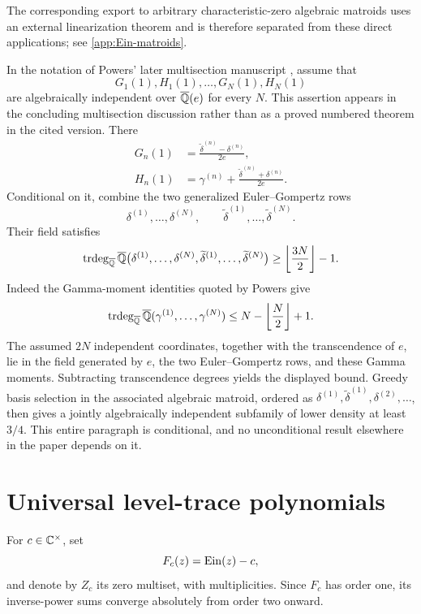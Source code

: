 The corresponding export to arbitrary characteristic-zero algebraic
matroids uses an external linearization theorem and is therefore separated
from these direct applications; see \cref{app:Ein-matroids}.

\begin{remark}
\label{rem:Powers-conditional}
In the notation of Powers' later multisection manuscript
\cite[\S5]{Powers2025}, assume that
\[
 G_1(1),H_1(1),\ldots,G_N(1),H_N(1)
\]
are algebraically independent over \(\overline{\mathbb Q}(e)\) for every \(N\).  This
assertion appears in the concluding multisection discussion rather than as
a proved numbered theorem in the cited version.  There
\begin{align*}
 G_n(1)&=\frac{\widetilde\delta^{(n)}-\delta^{(n)}}{2e},\\
 H_n(1)&=\gamma^{(n)}+
 \frac{\widetilde\delta^{(n)}+\delta^{(n)}}{2e}.
\end{align*}
Conditional on it, combine the two generalized Euler--Gompertz rows
\[
 \delta^{(1)},\ldots,\delta^{(N)},\qquad
 \widetilde\delta^{(1)},\ldots,\widetilde\delta^{(N)}.
\]
Their field satisfies
\[
 \operatorname{trdeg}_{\overline{\mathbb Q}}\overline{\mathbb Q}\bigl(
 \delta^{(1)},\ldots,\delta^{(N)},
 \widetilde\delta^{(1)},\ldots,\widetilde\delta^{(N)}\bigr)
 \ge\left\lfloor\frac{3N}{2}\right\rfloor-1.
\]
Indeed the Gamma-moment identities quoted by Powers give
\[
 \operatorname{trdeg}_{\overline{\mathbb Q}}\overline{\mathbb Q}(\gamma^{(1)},\ldots,\gamma^{(N)})
 \le N-\left\lfloor\frac N2\right\rfloor+1.
\]
The assumed \(2N\) independent coordinates, together with the
transcendence of \(e\), lie in the field generated by \(e\), the two
Euler--Gompertz rows, and these Gamma moments.  Subtracting transcendence
degrees yields the displayed bound.  Greedy basis selection in the
associated algebraic matroid, ordered as
\(\delta^{(1)},\widetilde\delta^{(1)},\delta^{(2)},\ldots\), then gives a
jointly algebraically independent subfamily of lower density at least
\(3/4\).  This entire paragraph is conditional, and no unconditional
result elsewhere in the paper depends on it.
\end{remark}

\section{Universal level-trace polynomials}
\label{sec:trace-polynomials}

For \(c\in\mathbb C^\times\), set
\[
 F_c(z)=\operatorname{Ein}(z)-c,
\]
and denote by \(Z_c\) its zero multiset, with multiplicities.  Since \(F_c\)
has order one, its inverse-power sums converge absolutely from order two
onward.

